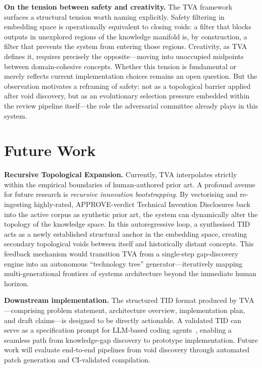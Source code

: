 \documentclass[11pt,twocolumn]{article}
\begin{document}
\textbf{On the tension between safety and creativity.}
The TVA framework surfaces a structural tension worth naming explicitly.
Safety filtering in embedding space is operationally equivalent to
closing voids: a filter that blocks outputs in unexplored regions of
the knowledge manifold is, by construction, a filter that prevents the
system from entering those regions.  Creativity, as TVA defines it,
requires precisely the opposite---moving into unoccupied midpoints
between domain-cohesive concepts.  Whether this tension is fundamental
or merely reflects current implementation choices remains an open
question.  But the observation motivates a reframing of safety: not as
a topological barrier applied after void discovery, but as an
evolutionary selection pressure embedded within the review pipeline
itself---the role the adversarial committee already plays in this system.

\section{Future Work}
\label{sec:future}

\textbf{Recursive Topological Expansion.}
Currently, TVA interpolates strictly within the empirical boundaries
of human-authored prior art.  A profound avenue for future research is
\emph{recursive innovation bootstrapping}.  By vectorising and
re-ingesting highly-rated, APPROVE-verdict Technical Invention
Disclosures back into the active corpus as synthetic prior art, the
system can dynamically alter the topology of the knowledge space.  In
this autoregressive loop, a synthesised TID acts as a newly
established structural anchor in the embedding space, creating
secondary topological voids between itself and historically distant
concepts.  This feedback mechanism would transition TVA from a
single-step gap-discovery engine into an autonomous ``technology tree''
generator---iteratively mapping multi-generational frontiers of systems
architecture beyond the immediate human horizon.

\textbf{Downstream implementation.}
The structured TID format produced by TVA---comprising problem
statement, architecture overview, implementation plan, and draft
claims---is designed to be directly actionable.  A validated TID
can serve as a specification prompt for LLM-based coding
agents~\cite{chen2021codex}, enabling a seamless path from
knowledge-gap discovery to prototype implementation.  Future work
will evaluate end-to-end pipelines from void discovery through
automated patch generation and CI-validated compilation.
\end{document}
